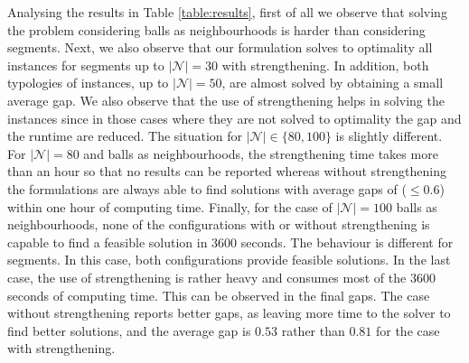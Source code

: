 \documentclass[a4paper,  review, authoryear, 1p.]{elsarticle}
\begin{document}
	Analysing the results in Table \ref{table:results}, first of all we observe that solving the problem considering balls as neighbourhoods is harder than considering segments. Next, we also observe that our formulation solves to optimality all instances for segments up to $|\mathcal{N}|=30$ with strengthening. In addition, both typologies of instances, up to $|\mathcal{N}|=50$, are almost solved by obtaining a small average gap. %
	We also observe that the use of strengthening helps in solving the instances since in those cases where they are not solved to optimality the gap and the runtime are reduced. The situation for $|\mathcal{N}|\in \{80,100\}$ is slightly different. For $|\mathcal{N}|=80$ and balls as neighbourhoods, the strengthening time takes more than an hour so that no results can be reported whereas without strengthening the formulations are always able to find solutions with average gaps of ($\le 0.6$) within one hour of computing time.  %
	Finally, for the case of $|\mathcal{N}|=100$ balls as neighbourhoods, none of the configurations with or without strengthening is capable to find a feasible solution in 3600 seconds. The behaviour is different for segments. In this case, both configurations provide feasible solutions. In the last case, the use of strengthening is rather heavy and consumes most of the 3600 seconds of computing time. This can be observed in the final gaps. The case without strengthening reports better gaps, as leaving more time to the solver to find better solutions, and the average gap is $0.53$ rather than $0.81$ for the case with strengthening.
	
\end{document}
